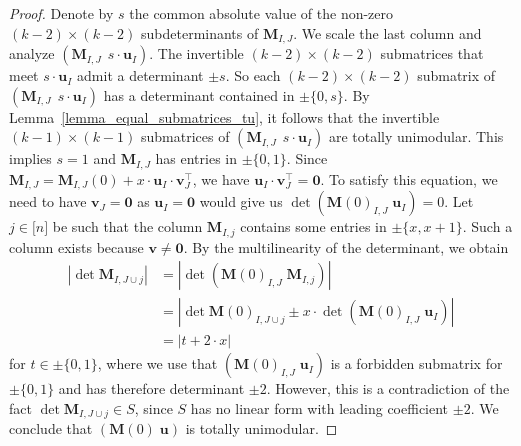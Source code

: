 \documentclass[a4paper, 11pt]{article}
\newcommand{\bv}{\bm{v}}
\newcommand{\bu}{\bm{u}}
\newcommand{\bM}{\bm{M}}
\newcommand{\indet}{x}
\newcommand{\polyS}{S}
\newcommand{\polyM}{\bM}
\begin{document}
\begin{proof}
		Denote by $s$ the common absolute value of the non-zero $(k-2)\times(k-2)$ subdeterminants of $\polyM_{I,J}$. We scale the last column and analyze $(\polyM_{I,J} \;\, s\cdot \bu_I)$. The invertible $(k-2) \times (k-2)$ submatrices that meet $s\cdot\bu_I$ admit a determinant $\pm s$. So each $(k-2)\times (k-2)$ submatrix of $(\polyM_{I,J} \;\, s\cdot \bu_I)$ has a determinant contained in $\pm\lbrace 0,s\rbrace$. 
		By Lemma~\ref{lemma_equal_submatrices_tu}, it follows that the invertible $(k-1)\times (k-1)$ submatrices of $(\polyM_{I,J} \;\, s\cdot \bu_I)$ are totally unimodular. This implies $s = 1$ and $\polyM_{I,J}$ has entries in $\pm\lbrace 0,1\rbrace$. Since $\polyM_{I,J}=\polyM_{I,J}(0)+x\cdot\bu_I\cdot\bv_J^\top$, we have $\bu_I\cdot\bv_J^\top=\bm{0}$. 
		To satisfy this equation, we need to have $\bv_J = \bm{0}$ as $\bu_I = \bm{0}$ would give us $\det(\bM(0)_{I,J}\;\bu_I) = 0$. Let $j\in\lbrack n\rbrack$ be such that the column $\polyM_{I,j}$  contains some entries in $\pm \lbrace \indet,\indet + 1\rbrace$. Such a column exists because $\bv\neq\bm{0}$. By the multilinearity of the determinant, we obtain
		\begin{align*}
			\left|\det\polyM_{I, J\cup j}\right| 
			&= \left|\det(\bM(0)_{I,J} \; \polyM_{I,j})\right| \\
			&= \left|\det\bM(0)_{I, J\cup j} \pm \indet\cdot\det (\bM(0)_{I,J} \; \bu_I)\right| \\
			&= \left|t + 2\cdot\indet\right|
		\end{align*}
		for $t\in\pm \lbrace 0, 1\rbrace$, where we use that $(\bM(0)_{I,J} \; \bu_I)$ is a forbidden submatrix for $\pm\lbrace 0,1\rbrace$ and has therefore determinant $\pm 2$. However, this is a contradiction of the fact $\det\polyM_{I, J\cup j}\in \polyS$, since $\polyS$ has no linear form with leading coefficient $\pm 2$. We conclude that $(\bM(0)\;\bu)$ is totally unimodular.
	\end{proof}
	
\end{document}
